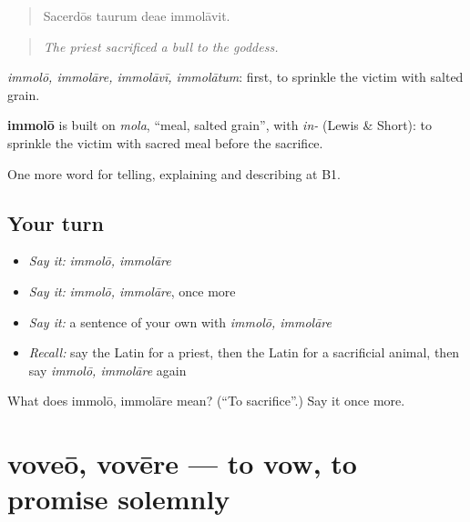 \begin{quote}
Sacerdōs taurum deae immolāvit.
\end{quote}

\begin{quote}
\emph{The priest sacrificed a bull to the goddess.}
\end{quote}

\emph{immolō, immolāre, immolāvī, immolātum}: first, to sprinkle the victim with salted grain.

\begin{cousinweb}
\textbf{immolō} is built on \emph{mola}, \textquotedblleft{}meal, salted grain\textquotedblright{}, with \emph{in-} (Lewis \& Short): to sprinkle the victim with sacred meal before the sacrifice.
\end{cousinweb}

\begin{grammarlens}[title={What you've built}]
One more word for telling, explaining and describing at B1.
\end{grammarlens}

\subsection*{Your turn}
\begin{itemize}
\raggedright
  \item \emph{Say it:} \emph{immolō, immolāre}
  \item \emph{Say it:} \emph{immolō, immolāre}, once more
  \item \emph{Say it:} a sentence of your own with \emph{immolō, immolāre}
  \item \emph{Recall:} say the Latin for a priest, then the Latin for a sacrificial animal, then say \emph{immolō, immolāre} again
\end{itemize}

\begin{tcolorbox}[breakable,colback=teal!4,colframe=teal!35!black,title={Before you move on}]
What does immolō, immolāre mean? (\textquotedblleft{}To sacrifice\textquotedblright{}.) Say it once more.
\end{tcolorbox}
\section[voveō, vovēre]{voveō, vovēre — to vow, to promise solemnly}

\label{lesson:LA-C334-voveo}



